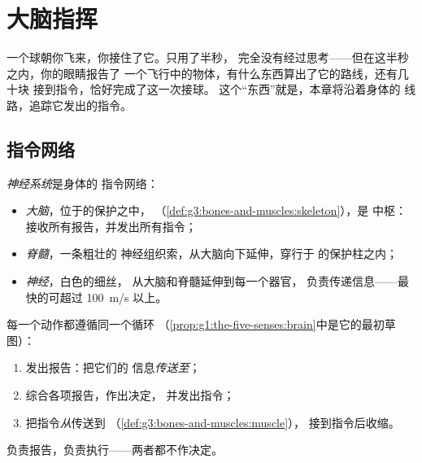 \chapter{大脑指挥}\label{ch:g5:brain-in-command}

一个球朝你飞来，你接住了它。只用了半秒，
完全没有经过思考——但在这半秒之内，你的眼睛报告了
一个飞行中的物体，有什么东西算出了它的路线，还有几十块
接到指令，恰好完成了这一次接球。
这个“东西”就是，本章将沿着身体的
线路，追踪它发出的指令。

\section{指令网络}

\begin{definition}[神经系统]\label{def:g5:brain-in-command:system}
\emph{神经系统}是身体的
指令网络：
\begin{itemize}
  \item \emph{大脑}，位于的保护之中，
        （\cref{def:g3:bones-and-muscles:skeleton}），是
        中枢：接收所有报告，并发出所有指令；
  \item \emph{脊髓}，一条粗壮的
        神经组织索，从大脑向下延伸，穿行于
        的保护柱之内；
  \item \emph{神经}，白色的细丝，
        从大脑和脊髓延伸到每一个器官，
        负责传递信息——最快的可超过
        \qty{100}{m/s} 以上。
\end{itemize}
\end{definition}

\begin{proposition}[报告、决定、指令]\label{prop:g5:brain-in-command:loop}
每一个动作都遵循同一个循环
（\cref{prop:g1:the-five-senses:brain}中是它的最初草图）：
\begin{enumerate}
  \item \emph{}发出报告：把它们的
        信息\emph{传送至}；
  \item \emph{}综合各项报告，作出决定，
        并发出指令；
  \item {}把指令\emph{从}传送到
        \emph{}（\cref{def:g3:bones-and-muscles:muscle}），
        接到指令后收缩。
\end{enumerate}
负责报告，负责执行——两者都不作决定。
\end{proposition}
\admitted

